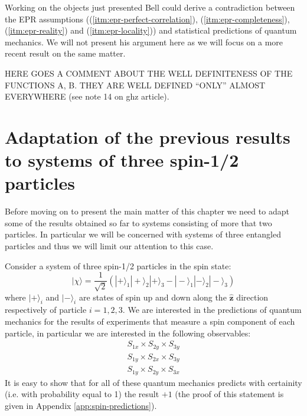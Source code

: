 \begin{observation}
Working on the objects just presented Bell \cite{Bell1964} could derive a contradiction between the EPR assumptions ((\ref{itm:epr-perfect-correlation}), (\ref{itm:epr-completeness}), (\ref{itm:epr-reality}) and (\ref{itm:epr-locality})) and statistical predictions of quantum mechanics. We will not present his argument here as we will focus on a more recent result on the same matter.
\end{observation}

\begin{observation}
  HERE GOES A COMMENT ABOUT THE WELL DEFINITENESS OF THE FUNCTIONS A, B. THEY ARE WELL DEFINED ``ONLY'' ALMOST EVERYWHERE (see note 14 on ghz article).
\end{observation}


\section{Adaptation of the previous results to systems of three spin-1/2 particles}
\label{sec:adaptation-to-3-particles}
Before moving on to present the main matter of this chapter we need to adapt some of the results obtained so far to systems consisting of more that two particles. In particular we will be concerned with systems of three entangled particles and thus we will limit our attention to this case.%

Consider a system of three spin-1/2 particles in the spin state:
\begin{equation}
  |\chi\rangle = \frac{1}{\sqrt{2}} \left( |+\rangle_1 |+\rangle_2 |+\rangle_3 - |-\rangle_1 |-\rangle_2 |-\rangle_3 \right)
  \label{eq:ghz-state}
\end{equation}
where $|+\rangle_i$ and $|-\rangle_i$ are states of spin up and down along the $\mathbf{\hat{z}}$ direction respectively of particle $i = 1, 2, 3$.
We are interested in the predictions of quantum mechanics for the results of experiments that measure a spin component of each particle, in particular we are interested in the following observables:
\begin{equation}
  \begin{split}
    S_{1x} \times S_{2y} \times S_{3y}\\
    S_{1y} \times S_{2x} \times S_{3y}\\
    S_{1y} \times S_{2y} \times S_{3x}
  \end{split}
  \label{eq:xyy-observables}
\end{equation}
It is easy to show that for all of these quantum mechanics predicts with certainity (i.e. with probability equal to 1) the result $+ 1$ (the proof of this statement is given in Appendix \ref{app:spin-predictions}).

